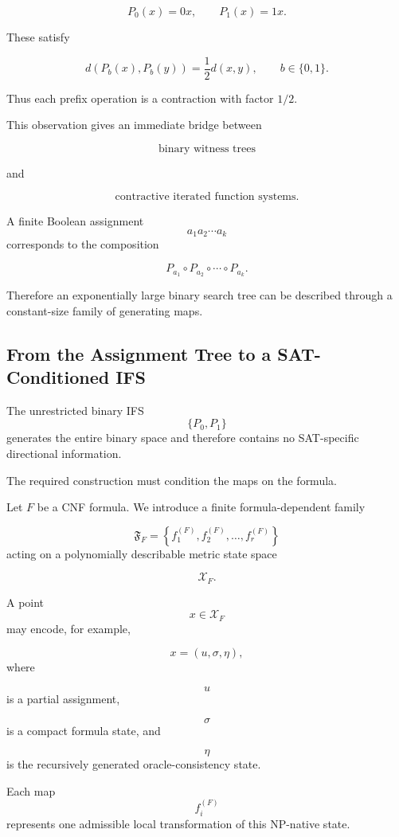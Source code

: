 \documentclass[11pt]{article}
\theoremstyle{plain}
\theoremstyle{definition}
\begin{document}
\[
    P_0(x)=0x,
    \qquad
    P_1(x)=1x.
\]

These satisfy

\[
    d(P_b(x),P_b(y))
    =
    \frac12 d(x,y),
    \qquad b\in\{0,1\}.
\]

Thus each prefix operation is a contraction with factor \(1/2\).

This observation gives an immediate bridge between

\[
    \boxed{\text{binary witness trees}}
\]

and

\[
    \boxed{\text{contractive iterated function systems}}.
\]

A finite Boolean assignment
\[
    a_1a_2\cdots a_k
\]
corresponds to the composition

\[
    P_{a_1}
    \circ
    P_{a_2}
    \circ
    \cdots
    \circ
    P_{a_k}.
\]

Therefore an exponentially large binary search tree can be described through
a constant-size family of generating maps.

\subsection{From the Assignment Tree to a SAT-Conditioned IFS}

The unrestricted binary IFS
\[
    \{P_0,P_1\}
\]
generates the entire binary space and therefore contains no SAT-specific
directional information.

The required construction must condition the maps on the formula.

Let \(F\) be a CNF formula.  We introduce a finite formula-dependent family

\[
    \mathfrak{F}_F
    =
    \left\{
        f^{(F)}_1,
        f^{(F)}_2,
        \dots,
        f^{(F)}_r
    \right\}
\]
acting on a polynomially describable metric state space

\[
    \mathcal{X}_F.
\]

A point
\[
    x\in\mathcal{X}_F
\]
may encode, for example,

\[
    x
    =
    (u,\sigma,\eta),
\]
where

\[
    u
\]
is a partial assignment,

\[
    \sigma
\]
is a compact formula state, and

\[
    \eta
\]
is the recursively generated oracle-consistency state.

Each map
\[
    f_i^{(F)}
\]
represents one admissible local transformation of this NP-native state.
\end{document}
